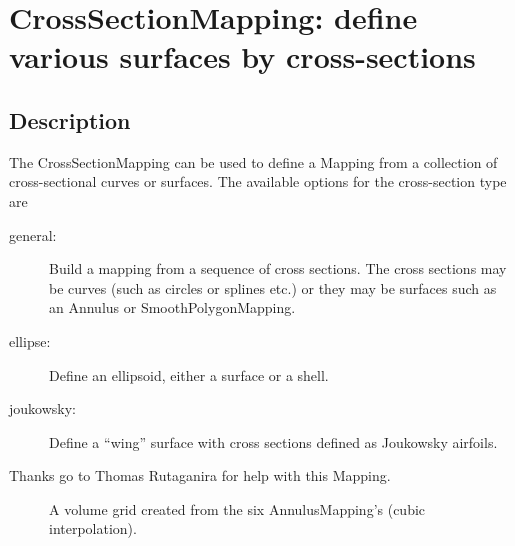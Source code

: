 \section{CrossSectionMapping: define various surfaces by cross-sections}

\subsection{Description}

The CrossSectionMapping can be used to define a Mapping from a collection of cross-sectional curves
or surfaces.
The available options for the cross-section type are
\begin{description}
  \item[general:] Build a mapping from a sequence of cross sections. The cross sections may
    be curves (such as circles or splines etc.) or they may be surfaces such as an Annulus
    or SmoothPolygonMapping.
 \item[ellipse:] Define an ellipsoid, either a surface or a shell.
 \item[joukowsky:] Define a ``wing'' surface with cross sections defined as Joukowsky airfoils.
\end{description}

Thanks go to Thomas Rutaganira for help with this Mapping.


\begin{figure}[hbt]
\newcommand{\figWidth}{9cm}
\newcommand{\trimfig}[2]{\trimFig{#1}{#2}{0.1}{.1}{.3}{.3}}
\begin{center}\small
 \caption{A volume grid created from the six AnnulusMapping's (cubic interpolation).}
\end{center}
\end{figure}


